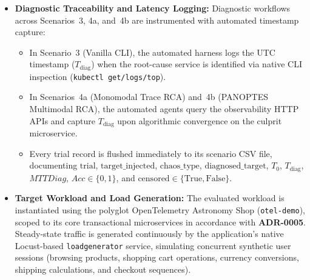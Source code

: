 \begin{itemize}
    \item \textbf{Diagnostic Traceability and Latency Logging:} Diagnostic workflows across Scenarios~3, 4a, and~4b are instrumented with automated timestamp capture:
    \begin{itemize}
        \item In Scenario~3 (Vanilla CLI), the automated harness logs the UTC timestamp ($T_{\text{diag}}$) when the root-cause service is identified via native CLI inspection (\texttt{kubectl get/logs/top}).
        \item In Scenarios~4a (Monomodal Trace RCA) and~4b (PANOPTES Multimodal RCA), the automated agents query the observability HTTP APIs and capture $T_{\text{diag}}$ upon algorithmic convergence on the culprit microservice.
        \item Every trial record is flushed immediately to its scenario CSV file, documenting $\text{trial}$, $\text{target\_injected}$, $\text{chaos\_type}$, $\text{diagnosed\_target}$, $T_0$, $T_{\text{diag}}$, $MTTDiag$, $Acc \in \{0, 1\}$, and $\text{censored} \in \{\text{True}, \text{False}\}$.
    \end{itemize}

    \item \textbf{Target Workload and Load Generation:} The evaluated workload is instantiated using the polyglot OpenTelemetry Astronomy Shop (\texttt{otel-demo}), scoped to its core transactional microservices in accordance with \textbf{ADR-0005}. Steady-state traffic is generated continuously by the application's native Locust-based \texttt{loadgenerator} service, simulating concurrent synthetic user sessions (browsing products, shopping cart operations, currency conversions, shipping calculations, and checkout sequences).
\end{itemize}
